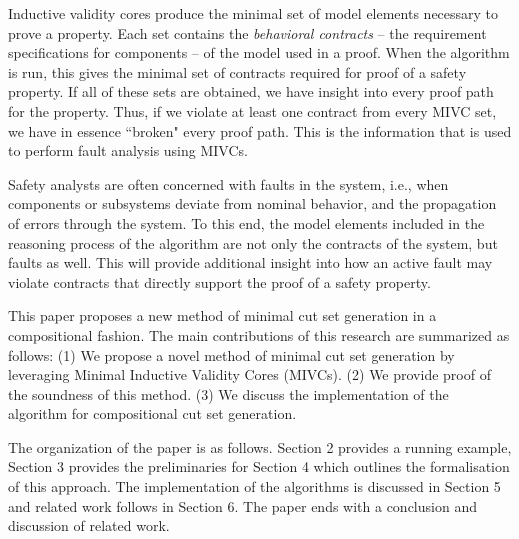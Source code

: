 Inductive validity cores produce the minimal set of model elements necessary to prove a property. Each set contains the \emph{behavioral contracts} -- the requirement specifications for components -- of the model used in a proof. When the \aivcalg algorithm is run, this gives the minimal set of contracts required for proof of a safety property. If all of these sets are obtained, we have insight into every proof path for the property. Thus, if we violate at least one contract from every MIVC set, we have in essence ``broken" every proof path. This is the information that is used to perform fault analysis using MIVCs.


Safety analysts are often concerned with faults in the system, i.e., when components or subsystems deviate from nominal behavior, and the propagation of errors through the system. To this end, the model elements included in the reasoning process of the \aivcalg algorithm are not only the contracts of the system, but faults as well. This will provide additional insight into how an active fault may violate contracts that directly support the proof of a safety property. 

This paper proposes a new method of minimal cut set generation in a compositional fashion. The main contributions of this research are summarized as follows: (1) We propose a novel method of minimal cut set generation by leveraging Minimal Inductive Validity Cores (MIVCs). %
(2) We provide proof of the soundness of this method. (3) We discuss the implementation of the algorithm for compositional cut set generation.

The organization of the paper is as follows.  Section 2 provides a running example, Section 3 provides the preliminaries for Section 4 which outlines the formalisation of this approach. The implementation of the algorithms is discussed in Section 5 and related work follows in Section 6. The paper ends with a conclusion and discussion of related work.

